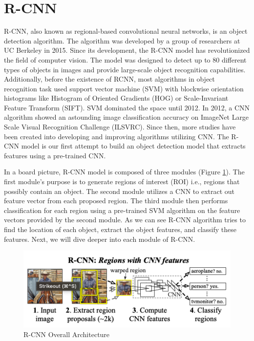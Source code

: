 \section{R-CNN}

R-CNN, also known as regional-based convolutional neural networks, is an object detection algorithm. The algorithm was developed by a group of researchers at UC Berkeley in 2015. Since its development, the R-CNN model has revolutionized the field of computer vision. The model was designed to detect up to 80 different types of objects in images and provide large-scale object recognition capabilities. Additionally, before the existence of RCNN, most algorithms in object recognition task used support vector machine (SVM) with blockwise orientation histograms like Histogram of Oriented Gradients (HOG) or Scale-Invariant Feature Transform (SIFT). SVM dominated the space until 2012. In 2012, a CNN algorithm showed an astounding image classification accuracy on ImageNet Large Scale Visual Recognition Challenge (ILSVRC). Since then, more studies have been created into developing and improving algorithms utilizing CNN. The R-CNN model is our first attempt to build an object detection model that extracts features using a pre-trained CNN.

In a board picture, R-CNN model is composed of three modules (Figure \ref{fig:rcnn_archiet}). The first module's purpose is to generate regions of interest (ROI) i.e., regions that possibly contain an object. The second module utilizes a CNN to extract out feature vector from each proposed region. The third module then performs classification for each region using a pre-trained SVM algorithm on the feature vectors provided by the second module. As we can see R-CNN algorithm tries to find the location of each object, extract the object features, and classify these features. Next, we will dive deeper into each module of R-CNN.

\begin{figure}[!ht]
    \centering
    \includegraphics[width=4.5in]{figures/rcnn_archiet.png}
    \caption{R-CNN Overall Architecture \cite{Girshick_R_CNN_2013}} \label{fig:rcnn_archiet}
\end{figure}

